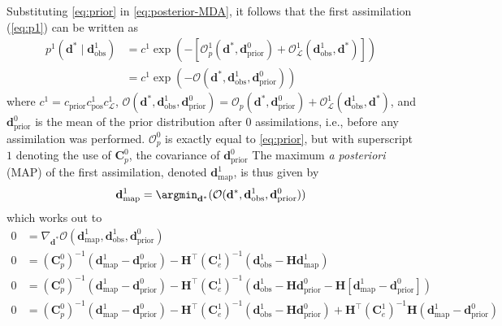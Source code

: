 Substituting \cref{eq:prior} in \cref{eq:posterior-MDA}, 
it follows that the first assimilation (\cref{eq:p1}) can be written as
%
\begin{align}
    p^1(\mathbf{d}^* \mid \mathbf{d}^1_\text{obs})
    &=
    c^1 \exp\left(
        -[
            \mathcal{O}^1_p(\mathbf{d}^*, \mathbf{d}^0_\text{prior}) + 
            \mathcal{O}^1_\mathcal{L}(\mathbf{d}^1_\text{obs}, \mathbf{d}^*)
        ]
    \right) \\
    &=
    c^1 \exp(-\mathcal{O}(\mathbf{d}^*, \mathbf{d}^1_\text{obs}, \mathbf{d}^0_\text{prior}))
\label{eq:posterior-MDA-1}
\end{align} 
%
where $c^1 = c_\text{prior} c^1_\text{pos} c^1_{\mathcal{L}}$,
$\mathcal{O}(\mathbf{d}^*, \mathbf{d}^1_\text{obs}, \mathbf{d}^0_\text{prior}) =  
\mathcal{O}_p(\mathbf{d}^*, \mathbf{d}^0_\text{prior}) + 
\mathcal{O}^1_\mathcal{L}(\mathbf{d}^1_\text{obs}, \mathbf{d}^*)$,
and $\mathbf{d}^0_\text{prior}$ is the mean of the prior distribution after 0 assimilations,
i.e., before any assimilation was performed.
%
$\mathcal{O}^0_p$ is exactly equal to \cref{eq:prior}, 
but with superscript $1$ denoting the use of $\mathbf{C}_p^0$, the covariance of $\mathbf{d}^0_\text{prior}$
%
The maximum \emph{a posteriori} (MAP) of the first assimilation,
denoted $\mathbf{d}^1_\text{map}$, is thus given by 
%
\begin{equation}
    \mathbf{d}^1_\text{map} 
    = \argmin_{\mathbf{d}^*} (
        \mathcal{O}(\mathbf{d}^*, \mathbf{d}^1_\text{obs}, \mathbf{d}^0_\text{prior})
    )
\label{eq:argmin}
\end{equation}
%
which works out to
%
\begin{align}
    0 &= \nabla_{\mathbf{d}^*} \mathcal{O}(
        \mathbf{d}^1_\text{map}, 
        \mathbf{d}^1_\text{obs}, 
        \mathbf{d}^0_\text{prior}
    ) 
    \\
    0 &=
    (\mathbf{C}^0_p)^{-1} (\mathbf{d}^1_\text{map} - \mathbf{d}^0_\text{prior})
    -
    \mathbf{H}^\top (\mathbf{C}_e^1)^{-1} 
    (\mathbf{d}^1_\text{obs} - \mathbf{H}\mathbf{d}^1_\text{map})
    \\
    0 &= 
    (\mathbf{C}^0_p)^{-1} (\mathbf{d}^1_\text{map} - \mathbf{d}^0_\text{prior})
    -
    \mathbf{H}^\top (\mathbf{C}_e^1)^{-1} 
    (\mathbf{d}^1_\text{obs} - \mathbf{H}\mathbf{d}^0_\text{prior} - 
     \mathbf{H}[\mathbf{d}^1_\text{map} - \mathbf{d}^0_\text{prior}])
    \\
    0 &= 
    (\mathbf{C}^0_p)^{-1} (\mathbf{d}^1_\text{map} - \mathbf{d}^0_\text{prior})
    -
    \mathbf{H}^\top (\mathbf{C}_e^1)^{-1} (\mathbf{d}^1_\text{obs} - \mathbf{H}\mathbf{d}^0_\text{prior}) 
    +
    \mathbf{H}^\top (\mathbf{C}_e^1)^{-1} \mathbf{H} (\mathbf{d}^1_\text{map} - \mathbf{d}^0_\text{prior})
\end{align}
